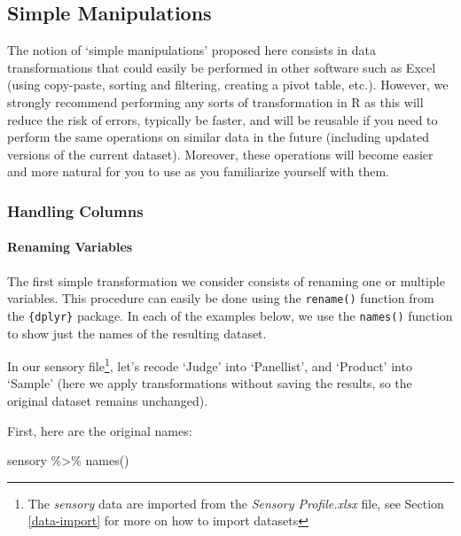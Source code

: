 \documentclass[
]{book}
\newenvironment{Shaded}{\begin{snugshade}}{\end{snugshade}}
\newcommand{\FunctionTok}[1]{\textcolor[rgb]{0.00,0.00,0.00}{#1}}
\newcommand{\NormalTok}[1]{#1}
\newcommand{\SpecialCharTok}[1]{\textcolor[rgb]{0.00,0.00,0.00}{#1}}
\begin{document}
\hypertarget{simple-manipulations}{%
\subsection{Simple Manipulations}\label{simple-manipulations}}

The notion of `simple manipulations' proposed here consists in data transformations that could easily be performed in other software such as Excel (using copy-paste, sorting and filtering, creating a pivot table, etc.). However, we strongly recommend performing any sorts of transformation in R as this will reduce the risk of errors, typically be faster, and will be reusable if you need to perform the same operations on similar data in the future (including updated versions of the current dataset). Moreover, these operations will become easier and more natural for you to use as you familiarize yourself with them.

\hypertarget{handling-columns}{%
\subsubsection{Handling Columns}\label{handling-columns}}

\hypertarget{renaming-variables}{%
\paragraph{Renaming Variables}\label{renaming-variables}}

The first simple transformation we consider consists of renaming one or multiple variables. This procedure can easily be done using the \texttt{rename()} function from the \texttt{\{dplyr\}} package. In each of the examples below, we use the \texttt{names()} function to show just the names of the resulting dataset.

In our sensory file\footnote{The \emph{sensory} data are imported from the \emph{Sensory Profile.xlsx} file, see Section \ref{data-import} for more on how to import datasets}, let's recode `Judge' into `Panellist', and `Product' into `Sample' (here we apply transformations without saving the results, so the original dataset remains unchanged).

First, here are the original names:

\begin{Shaded}
\begin{Highlighting}[]
\NormalTok{sensory }\SpecialCharTok{\%\textgreater{}\%} 
  \FunctionTok{names}\NormalTok{()}
\end{Highlighting}
\end{Shaded}
\end{document}
